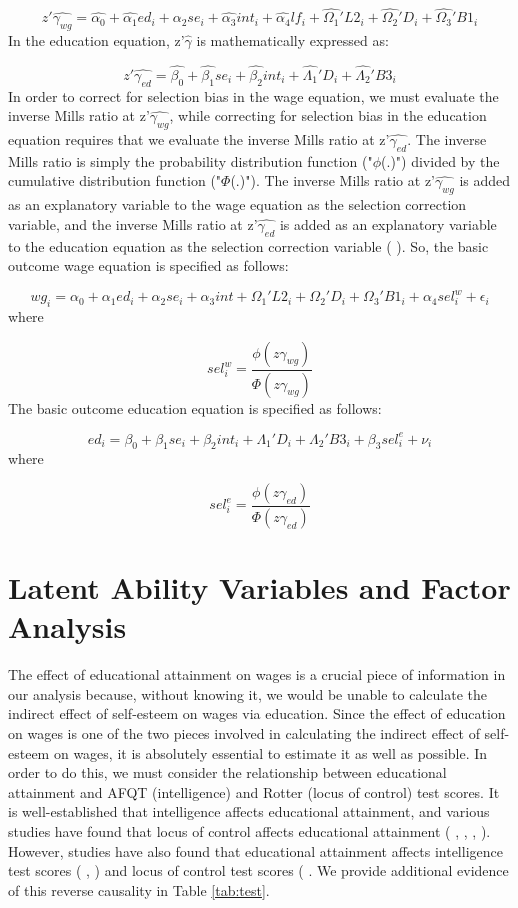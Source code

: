\documentclass[12pt]{report}
\newcommand{\beq}{\begin{equation}}
\newcommand{\eeq}{\end{equation}}
\newcommand{\citee}[1]{\citename{#1} \citeyear{#1}}
\begin{document}
\beq z'\hat{\gamma_{wg}} = \hat{\alpha_0} + \hat{\alpha_1} ed_i + \hat{\alpha_2} se_i + \hat{\alpha_3} int_i + \hat{\alpha_4} lf_i +\hat{\Omega_1}' L2_i + \hat{\Omega_2}' D_i + \hat{\Omega_3}' B1_i\eeq
In the education equation, z'$\hat{\gamma}$ is mathematically expressed as:

\beq z'\hat{\gamma_{ed}} = \hat{\beta_0} + \hat{\beta_1} se_i + \hat{\beta_2} int_i + \hat{\Lambda_1}' D_i + \hat{\Lambda_2}' B3_i\eeq
In order to correct for selection bias in the wage equation, we must evaluate the inverse Mills ratio at z'$\hat{\gamma_{wg}}$, while correcting for selection bias in the education equation requires that we evaluate the inverse Mills ratio at z'$\hat{\gamma_{ed}}$. The inverse Mills ratio is simply the probability distribution function ("$\phi$(.)") divided by the cumulative distribution function ("$\Phi$(.)"). The inverse Mills ratio at z'$\hat{\gamma_{wg}}$ is added as an explanatory variable to the wage equation as the selection correction variable, and the inverse Mills ratio at z'$\hat{\gamma_{ed}}$ is added as an explanatory variable to the education equation as the selection correction variable (\citee{W2009}).
So, the basic outcome wage equation is specified as follows:

\beq wg_i = \alpha_0 + \alpha_1 ed_i + \alpha_2 se_i + \alpha_3 int + \Omega_1' L2_i + \Omega_2' D_i + \Omega_3' B1_i + \alpha_4 sel_i^w + \epsilon_i\eeq
where

\beq sel_i^w = \frac{\phi(z\gamma_{wg})}{\Phi(z\gamma_{wg})}\eeq
The basic outcome education equation is specified as follows:

\beq ed_i = \beta_0 + \beta_1 se_i + \beta_2 int_i + \Lambda_1' D_i + \Lambda_2' B3_i + \beta_3 sel_i^e + \nu_i\eeq
where

\beq sel_i^e = \frac{\phi(z\gamma_{ed})}{\Phi(z\gamma_{ed})}\eeq


\section*{Latent Ability Variables and Factor Analysis}

The effect of educational attainment on wages is a crucial piece of information in our analysis because, without knowing it, we would be unable to calculate the indirect effect of self-esteem on wages via education. Since the effect of education on wages is one of the two pieces involved in calculating the indirect effect of self-esteem on wages, it is absolutely essential to estimate it as well as possible. In order to do this, we must consider the relationship between educational attainment and AFQT (intelligence) and Rotter (locus of control) test scores. It is well-established that intelligence affects educational attainment, and various studies have found that locus of control affects educational attainment (\citee{W1999}, \citee{RB2000}, \citee{CD2003}, \citee{PP2010}). However, studies have also found that educational attainment affects intelligence test scores (\citee{HHM2003}, \citee{HM1994}) and locus of control test scores (\citee{RB2000}. We provide additional evidence of this reverse causality in Table \ref{tab:test}.
\end{document}
